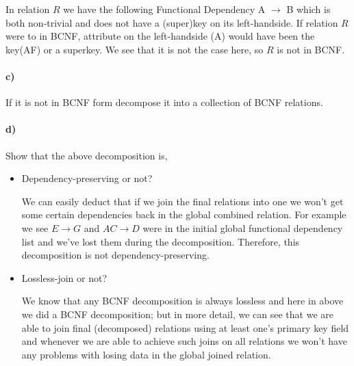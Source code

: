 \documentclass[a4paper,12pt]{article}
\begin{document}
\begin{tcolorbox}
In relation $R$ we have the following Functional Dependency A $\rightarrow$ B which is both non-trivial and does not have a (super)key on its left-handside. If relation $R$ were to in BCNF, attribute on the left-handside (A) would have been the key(AF) or a superkey. We see that it is not the case here, so $R$ is not in BCNF.
\end{tcolorbox}

\newpage
\paragraph{c)} If it is not in BCNF form decompose it into a collection of BCNF relations. \\

\begin{tcolorbox}

\end{tcolorbox}

\paragraph{d)} Show that the above decomposition is,\\

\begin{itemize}
    \item Dependency-preserving or not?
    \begin{tcolorbox}
    We can easily deduct that if we join the final relations into one we won't get some certain dependencies back in the global combined relation. For example we see $E \to G$ and $AC \to D$ were in the initial global functional dependency list and we've lost them during the decomposition. Therefore, this decomposition is not dependency-preserving. 
    \end{tcolorbox}
    
    \item Lossless-join or not?
    \begin{tcolorbox}
    We know that any BCNF decomposition is always lossless and here in above we did a BCNF decomposition; but in more detail, we can see that we are able to join final (decomposed) relations using at least one's primary key field and whenever we are able to achieve such joins on all relations we won't have any problems with losing data in the global joined relation. 
    \end{tcolorbox}
\end{itemize}
\end{document}
